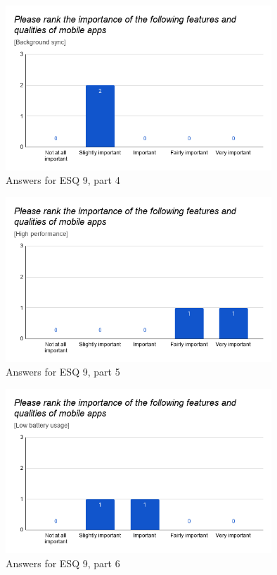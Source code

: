 \documentclass[a4paper,12pt]{article}
\begin{document}
\begin{figure}[ht!]
    \centering
    \includegraphics[width=10cm]{img/Results/esq9_4.png}
    \caption{Answers for ESQ 9, part 4}
    \label{fig:res_eduq9_4}
\end{figure}

\begin{figure}[ht!]
    \centering
    \includegraphics[width=10cm]{img/Results/esq9_5.png}
    \caption{Answers for ESQ 9, part 5}
    \label{fig:res_eduq9_5}
\end{figure}

\begin{figure}[ht!]
    \centering
    \includegraphics[width=10cm]{img/Results/esq9_6.png}
    \caption{Answers for ESQ 9, part 6}
    \label{fig:res_eduq9_6}
\end{figure}
\end{document}
